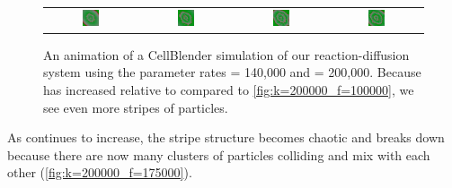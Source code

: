 \begin{figure}[h]
\begin{tabular}{c c c c}
\includegraphics[width = 0.2\textwidth]{../images/predator_prey_11_by_11_f_1.4_k_2_i4.png} & \includegraphics[width = 0.2\textwidth]{../images/../images/predator_prey_11_by_11_f_1.4_k_2_i5.png} & \includegraphics[width = 0.2\textwidth]{../images/../images/predator_prey_11_by_11_f_1.4_k_2_i6.png} & \includegraphics[width = 0.2\textwidth]{../images/../images/predator_prey_11_by_11_f_1.4_k_2_i7.png}
\end{tabular}
\caption{An animation of a CellBlender simulation of our reaction-diffusion system using the parameter rates  = 140,000 and  = 200,000. Because  has increased relative to  compared to \autoref{fig:k=200000_f=100000}, we see even more stripes of  particles.}
\label{fig:k=200000_f=140000}
\end{figure}

As  continues to increase, the stripe structure becomes chaotic and breaks down because there are now many clusters of  particles colliding and mix with each other (\autoref{fig:k=200000_f=175000}).

